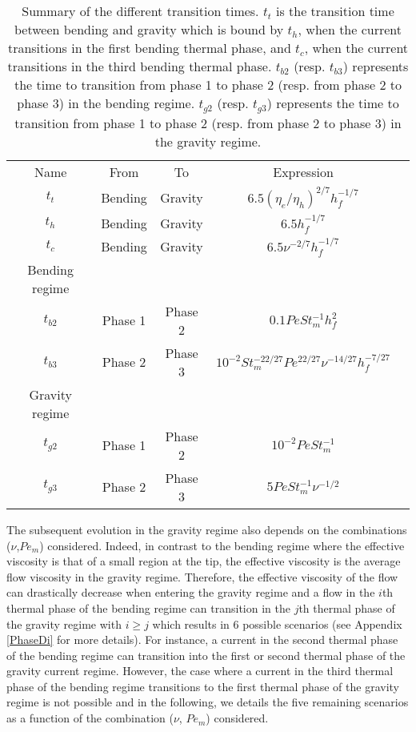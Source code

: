 \begin{table}
  \begin{center}
    \begin{tabular}{ccccc}
      Name&From&To&Expression\\
      $t_t$&Bending&Gravity&$6.5(\eta_e/\eta_h)^{2/7}h_f^{-1/7}$\\
      $t_h$&Bending&Gravity&$6.5h_f^{-1/7}$\\
      $t_c$&Bending&Gravity&$6.5\nu^{-2/7}h_f^{-1/7}$\\
      Bending regime&\multicolumn{3}{c}{} \\
      $t_{b2}$&Phase 1& Phase 2&$0.1Pe St_m^{-1} h_f^2$\\
      $t_{b3}$&Phase 2& Phase 3 &$10^{-2} St_m^{-22/27}Pe^{22/27}\nu^{-14/27}h_f^{-7/27}$\\
      Gravity regime&\multicolumn{3}{c}{} \\
      $t_{g2}$ &Phase 1& Phase 2 &$10^{-2}PeSt_m^{-1}$\\
      $t_{g3}$ &Phase 2& Phase 3 &$ 5Pe St_m^{-1}\nu^{-1/2}$\\
    \end{tabular}
    \caption{Summary of the different  transition times.  $t_t$ is the
      transition time  between bending and  gravity which is  bound by
      $t_h$, when the current transitions in the first bending thermal
      phase,  and $t_c$,  when the  current transitions  in the  third
      bending thermal phase.  $t_{b2}$ (resp. $t_{b3}$) represents the
      time to transition  from phase 1 to phase 2  (resp. from phase 2
      to phase  3) in  the bending  regime. $t_{g2}$  (resp. $t_{g3}$)
      represents  the time  to  transition  from phase  1  to phase  2
      (resp. from phase 2 to phase 3) in the gravity regime. }
    \label{tab:TimeTransition}
  \end{center}
\end{table}
The subsequent  evolution in  the gravity regime  also depends  on the
combinations ($\nu$,$Pe_m$)  considered.  Indeed,  in contrast  to the
bending regime where the effective viscosity is that of a small region
at the tip,  the effective viscosity is the average  flow viscosity in
the gravity  regime.  Therefore, the  effective viscosity of  the flow
can drastically decrease  when entering the gravity regime  and a flow
in the $i$th thermal phase of the bending regime can transition in the
$j$th thermal phase of the gravity  regime with $i\ge j$ which results
in  $6$  possible  scenarios  (see  Appendix  \ref{PhaseDi}  for  more
details).  For instance, a current in  the second thermal phase of the
bending regime can  transition into the first or  second thermal phase
of the  gravity current regime. However,  the case where a  current in
the third thermal phase of the bending regime transitions to the first
thermal  phase of  the  gravity  regime is  not  possible  and in  the
following, we  details the five  remaining scenarios as a  function of
the combination ($\nu$, $Pe_m$) considered.


